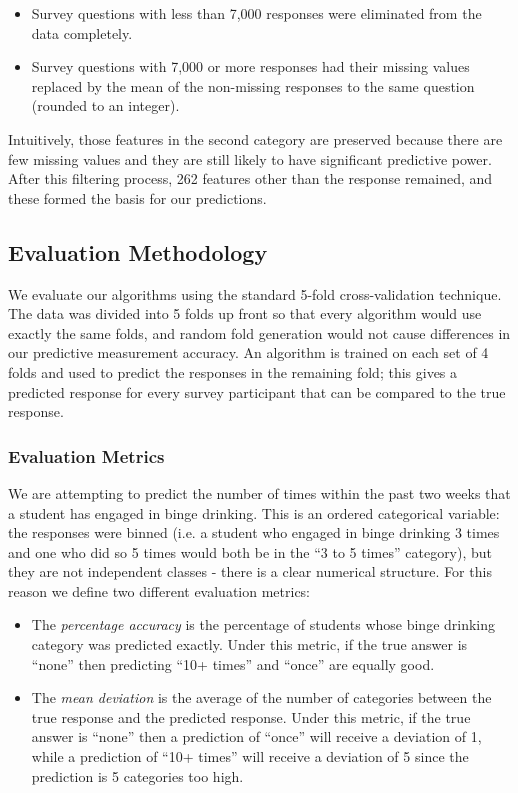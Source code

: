\begin{itemize}
\item Survey questions with less than 7,000 responses were eliminated from the data completely.
\item Survey questions with 7,000 or more responses had their missing values replaced by the mean of the non-missing responses to the same question (rounded to an integer).
\end{itemize}

Intuitively, those features in the second category are preserved because there are few missing values and they are still likely to have significant predictive power.  After this filtering process, 262 features other than the response remained, and these formed the basis for our predictions.

\subsection{Evaluation Methodology}

We evaluate our algorithms using the standard 5-fold cross-validation technique.  The data was divided into 5 folds up front so that every algorithm would use exactly the same folds, and random fold generation would not cause differences in our predictive measurement accuracy.  An algorithm is trained on each set of 4 folds and used to predict the responses in the remaining fold; this gives a predicted response for every survey participant that can be compared to the true response.

\subsubsection{Evaluation Metrics}

We are attempting to predict the number of times within the past two weeks that a student has engaged in binge drinking.  This is an ordered categorical variable: the responses were binned (i.e. a student who engaged in binge drinking 3 times and one who did so 5 times would both be in the ``3 to 5 times'' category), but they are not independent classes - there is a clear numerical structure.  For this reason we define two different evaluation metrics:

\begin{itemize}
\item The \emph{percentage accuracy} is the percentage of students whose binge drinking category was predicted exactly.  Under this metric, if the true answer is ``none'' then predicting ``10+ times'' and ``once'' are equally good.
\item The \emph{mean deviation} is the average of the number of categories between the true response and the predicted response. Under this metric, if the true answer is ``none'' then a prediction of ``once'' will receive a deviation of 1, while a prediction of ``10+ times'' will receive a deviation of 5 since the prediction is 5 categories too high.
\end{itemize}

